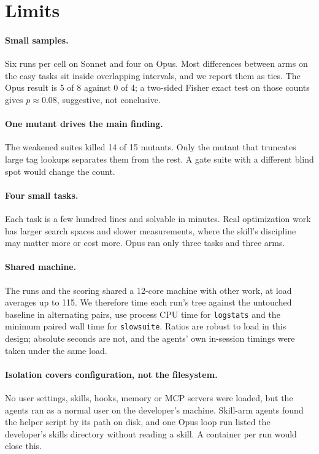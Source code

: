 \section{Limits}
\label{sec:limits}

\paragraph{Small samples.} Six runs per cell on Sonnet and four on Opus. Most differences between arms on the
easy tasks sit inside overlapping intervals, and we report them as ties. The Opus result is 5 of 8 against 0 of
4; a two-sided Fisher exact test on those counts gives $p \approx 0.08$, suggestive, not conclusive.

\paragraph{One mutant drives the main finding.} The weakened suites killed 14 of 15 mutants. Only the mutant
that truncates large tag lookups separates them from the rest. A gate suite with a different blind spot would
change the count.

\paragraph{Four small tasks.} Each task is a few hundred lines and solvable in minutes. Real optimization work
has larger search spaces and slower measurements, where the skill's discipline may matter more or cost more.
Opus ran only three tasks and three arms.

\paragraph{Shared machine.} The runs and the scoring shared a 12-core machine with other work, at load averages
up to 115. We therefore time each run's tree against the untouched baseline in alternating pairs, use process
CPU time for \texttt{logstats} and the minimum paired wall time for \texttt{slowsuite}. Ratios are robust to
load in this design; absolute seconds are not, and the agents' own in-session timings were taken under the same
load.

\paragraph{Isolation covers configuration, not the filesystem.} No user settings, skills, hooks, memory or MCP
servers were loaded, but the agents ran as a normal user on the developer's machine. Skill-arm agents found the
helper script by its path on disk, and one Opus \textsf{loop} run listed the developer's skills directory without
reading a skill. A container per run would close this.

